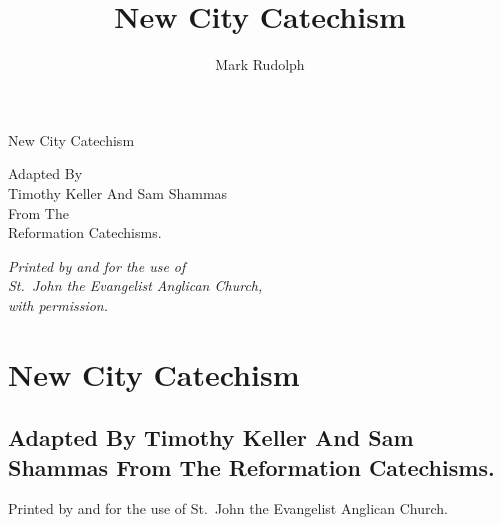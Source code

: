 \documentclass[titlepage]{memoir}
\title{New City Catechism}
\author{Mark Rudolph}
\date{}
\begin{document}


\frontmatter

\pagestyle{empty}

\vfill

\begin{center}
	\begin{minipage}{3in}
	{\centering
	\Huge{New City Catechism}
	\par}
	\end{minipage}
\end{center}

\vfill

\begin{center}
	\begin{minipage}{3in}
	{\centering
	Adapted By\\
	Timothy Keller And Sam Shammas\\
	From The\\
	Reformation Catechisms.\par}
	\end{minipage}
\end{center}

\vfill

\begin{center}
	\begin{minipage}{3in}
	\begin{center}
	{\em Printed by and for the use of\\ St.\ John the Evangelist Anglican Church,\\ with permission.}
	\end{center}
	\end{minipage}
\end{center}

\vfill

\cleardoublepage
{}

\chapter*{New City Catechism}

\section*{Adapted By Timothy Keller And Sam Shammas From The Reformation Catechisms.}

Printed by and for the use of St.\ John the Evangelist Anglican Church.
\end{document}
